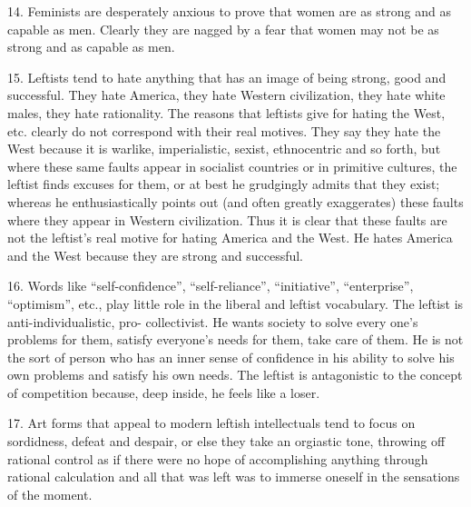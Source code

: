 \documentclass{article}
\begin{document}
14.  Feminists  are  desperately  anxious  to  prove  that  women  are  as  strong  and  as  capable  as  
men.  Clearly they are nagged by a fear that women may not be as strong and as capable as men. \vspace{\baselineskip}

15.  Leftists tend to hate anything that has an image of being strong, good and successful.  They 
hate  America,  they  hate  Western  civilization,  they  hate  white  males,  they  hate  rationality.   The 
reasons  that  leftists  give  for  hating  the  West,  etc. clearly  do  not  correspond  with  their  real  
motives.  They say they hate the West because it is warlike, imperialistic, sexist, ethnocentric and 
so forth, but where these same faults appear in socialist countries or in primitive cultures, the leftist 
finds excuses for them, or at best he grudgingly admits that they exist; whereas he enthusiastically 
points out (and often greatly exaggerates) these faults where they appear in Western 
civilization.  Thus it is clear that these faults are not the leftist’s real motive for hating America 
and the West.  He hates America and the West because they are strong and successful. \vspace{\baselineskip}

16.  Words like “self-confidence”, “self-reliance”, “initiative”, “enterprise”, “optimism”, etc., play 
little role in the liberal and leftist vocabulary.  The leftist is anti-individualistic, pro-
collectivist.  He wants society to solve every one’s problems for them, satisfy everyone’s needs 
for them, take care of them.  He is not the sort of person who has an inner sense of confidence in 
his ability to solve his own problems and satisfy his own needs.  The leftist is antagonistic to the 
concept of competition because, deep inside, he feels like a loser. \vspace{\baselineskip}

17.  Art forms that appeal to modern leftish intellectuals tend to focus on sordidness, defeat and 
despair, or else they take an orgiastic tone, throwing off rational control as if there were no hope 
of accomplishing anything through rational calculation and all that was left was to immerse oneself 
in the sensations of the moment. \vspace{\baselineskip}
\end{document}
